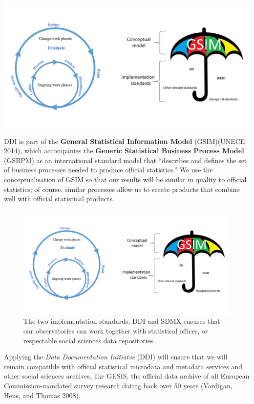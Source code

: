 \documentclass[
  letterpaper,
  DIV=11,
  numbers=noendperiod]{scrreprt}
\begin{document}
\includegraphics{png/datamodels/gsim.png}

DDI is part of the \textbf{General Statistical Information Model}
(GSIM)(UNECE 2014), which accompanies the \textbf{Generic Statistical
Business Process Model} (GSBPM) as an international standard model that
``describes and defines the set of business processes needed to produce
official statistics.'' We use the conceptualisation of GSIM so that our
results will be similar in quality to official statistics; of course,
similar processes allow us to create products that combine well with
official statistical products.

\begin{figure}[H]

{\centering \includegraphics{png/datamodels/gsim.png}

}

\caption{The two implementation standards, DDI and SDMX ensures that our
observatories can work together with statistical offices, or respectable
social sciences data repositories.}

\end{figure}%

Applying the \emph{Data Documentation Initiatve} (DDI) will ensure that
we will remain compatible with official statistical microdata and
metadata services and other social sciences archives, like GESIS, the
official data archive of all European Commission-mandated survey
research dating back over 50 years (Vardigan, Heus, and Thomas 2008).
\end{document}
